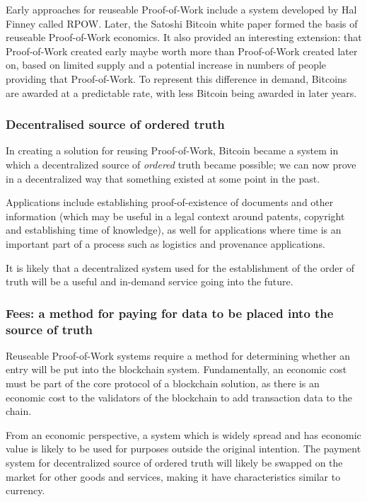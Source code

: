 \documentclass[a4paper,12pt]{article}
\begin{document}
Early approaches for reuseable Proof-of-Work include a system developed by Hal Finney called RPOW\cite{reusablePoW}. Later, the Satoshi Bitcoin white paper \cite{SatoshiPaper} formed the basis of reuseable Proof-of-Work economics. It also provided an interesting extension: that Proof-of-Work created early maybe worth more than Proof-of-Work created later on, based on limited supply and a potential increase in numbers of people providing that Proof-of-Work. To represent this difference in demand, Bitcoins are awarded at a predictable rate, with less Bitcoin being awarded in later years. 

\subsubsection{Decentralised source of ordered truth}
In creating a solution for reusing Proof-of-Work, Bitcoin became a system in which a decentralized source of \textit{ordered} truth became possible; we can now prove in a decentralized way that something existed at some point in the past.

Applications include establishing proof-of-existence of documents and other information (which may be useful in a legal context around patents, copyright and establishing time of knowledge), as well for applications where time is an important part of a process such as logistics and provenance applications.

It is likely that a decentralized system used for the establishment of the order of truth will be a useful and in-demand service going into the future. 

\subsubsection{Fees: a method for paying for data to be placed into the source of truth}
Reuseable Proof-of-Work systems require a method for determining whether an entry will be put into the blockchain system. Fundamentally, an economic cost must be part of the core protocol of a blockchain solution, as there is an economic cost to the validators of the blockchain to add transaction data to the chain. 

From an economic perspective, a system which is widely spread and has economic value is likely to be used for purposes outside the original intention. The payment system for decentralized source of ordered truth will likely be swapped on the market for other goods and services, making it have characteristics similar to currency.
\end{document}
